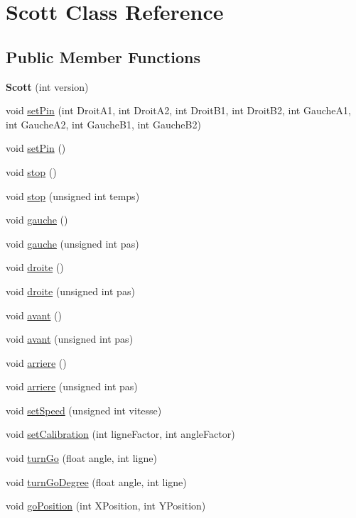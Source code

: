 \hypertarget{class_scott}{}\section{Scott Class Reference}
\label{class_scott}
\subsection*{Public Member Functions}
\begin{DoxyCompactItemize}
\item 
\hypertarget{class_scott_a0d23c88c6a37d559e21dae63315d0649}{}\label{class_scott_a0d23c88c6a37d559e21dae63315d0649} 
{\bfseries Scott} (int version)
\item 
void \hyperlink{class_scott_a03810d284564569d63f6afd3548f1504}{set\+Pin} (int Droit\+A1, int Droit\+A2, int Droit\+B1, int Droit\+B2, int Gauche\+A1, int Gauche\+A2, int Gauche\+B1, int Gauche\+B2)
\item 
void \hyperlink{class_scott_a3aa3b335480673414064df483075e26b}{set\+Pin} ()
\item 
void \hyperlink{class_scott_a30f235072b621cfa3995232b2e9ce8d2}{stop} ()
\item 
void \hyperlink{class_scott_accece4d18e1a5b28b0dc36f5fbbe0757}{stop} (unsigned int temps)
\item 
void \hyperlink{class_scott_a5773db050c4798913a84a429bd57e87a}{gauche} ()
\item 
void \hyperlink{class_scott_a7f52564ed11006cdb8c2e6346d1db58a}{gauche} (unsigned int pas)
\item 
void \hyperlink{class_scott_aa3619ee2b7866d3274818347f10578ed}{droite} ()
\item 
void \hyperlink{class_scott_a459a0036b30c72a47ec84dd1e9e8023b}{droite} (unsigned int pas)
\item 
void \hyperlink{class_scott_aba59b4c4ed89d7c2ce178498a177f5ed}{avant} ()
\item 
void \hyperlink{class_scott_ae7e476d962f7e2ecc8dc6daeb5d96445}{avant} (unsigned int pas)
\item 
void \hyperlink{class_scott_aa61eeb821a3dcbaa8785f69ead328d99}{arriere} ()
\item 
void \hyperlink{class_scott_a9588bb8f527008d129612593cdf4b3c7}{arriere} (unsigned int pas)
\item 
void \hyperlink{class_scott_ae74032c88526e506b0107417ab609ce9}{set\+Speed} (unsigned int vitesse)
\item 
void \hyperlink{class_scott_a01aa6dd0028cad19003380dd8915fb01}{set\+Calibration} (int ligne\+Factor, int angle\+Factor)
\item 
void \hyperlink{class_scott_ad8d8c12ec3cb4c2cc79534657edbd59e}{turn\+Go} (float angle, int ligne)
\item 
void \hyperlink{class_scott_a848ec37dc368c290c3bab1345310bbf1}{turn\+Go\+Degree} (float angle, int ligne)
\item 
void \hyperlink{class_scott_ac14ba7d931832ec51632fd47fec2ce00}{go\+Position} (int X\+Position, int Y\+Position)
\end{DoxyCompactItemize}


